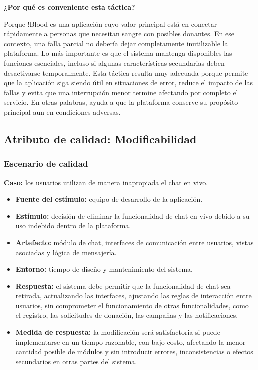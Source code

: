 \medskip
\noindent\textbf{¿Por qué es conveniente esta táctica?}

Porque !Blood es una aplicación cuyo valor principal está en conectar rápidamente a personas que necesitan sangre con posibles donantes. En ese contexto, una falla parcial no debería dejar completamente inutilizable la plataforma. Lo más importante es que el sistema mantenga disponibles las funciones esenciales, incluso si algunas características secundarias deben desactivarse temporalmente. Esta táctica resulta muy adecuada porque permite que la aplicación siga siendo útil en situaciones de error, reduce el impacto de las fallas y evita que una interrupción menor termine afectando por completo el servicio. En otras palabras, ayuda a que la plataforma conserve su propósito principal aun en condiciones adversas.

\subsection{Atributo de calidad: Modificabilidad}

\subsubsection{Escenario de calidad}

\textbf{Caso:} los usuarios utilizan de manera inapropiada el chat en vivo.

\begin{itemize}
    \item \textbf{Fuente del estímulo:} equipo de desarrollo de la aplicación.
    \item \textbf{Estímulo:} decisión de eliminar la funcionalidad de chat en vivo debido a su uso indebido dentro de la plataforma.
    \item \textbf{Artefacto:} módulo de chat, interfaces de comunicación entre usuarios, vistas asociadas y lógica de mensajería.
    \item \textbf{Entorno:} tiempo de diseño y mantenimiento del sistema.
    \item \textbf{Respuesta:} el sistema debe permitir que la funcionalidad de chat sea retirada, actualizando las interfaces, ajustando las reglas de interacción entre usuarios, sin comprometer el funcionamiento de otras funcionalidades, como el registro, las solicitudes de donación, las campañas y las notificaciones.
    \item \textbf{Medida de respuesta:} la modificación será satisfactoria si puede implementarse en un tiempo razonable, con bajo costo, afectando la menor cantidad posible de módulos y sin introducir errores, inconsistencias o efectos secundarios en otras partes del sistema.
\end{itemize}


